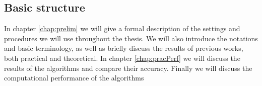 \subsection{Basic structure}
In chapter \ref{chap:prelim} we will give a formal description of the settings and procedures we will use throughout the thesis. We will also introduce the notations and basic terminology, as well as briefly discuss the results of previous works, both practical and theoretical. In chapter \ref{chap:pracPerf} we will discuss the results of the algorithms and compare their accuracy. Finally we will discuss the computational performance of the algorithms    
